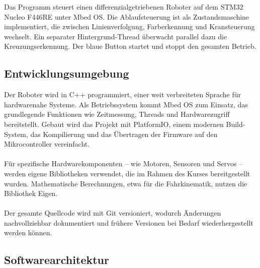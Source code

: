 \documentclass[11pt,a4paper]{article}
\begin{document}
	Das Programm steuert einen differenzialgetriebenen Roboter auf dem STM32 Nucleo F446RE unter Mbed OS. Die Ablaufsteuerung ist als Zustandsmaschine implementiert, die zwischen              
	Linienverfolgung, Farberkennung und Kransteuerung wechselt. Ein separater Hintergrund-Thread überwacht parallel dazu die Kreuzungserkennung. Der blaue Button startet und stoppt den
	gesamten Betrieb.
	
	\subsection{Entwicklungsumgebung}
	Der Roboter wird in C++ programmiert, einer weit verbreiteten Sprache für hardwarenahe Systeme. Als Betriebssystem kommt Mbed OS zum Einsatz, das grundlegende Funktionen wie Zeitmessung,  
	Threads und Hardwarezugriff bereitstellt. Gebaut wird das Projekt mit PlatformIO, einem modernen Build-System, das Kompilierung und das Übertragen der Firmware auf den Mikrocontroller
	vereinfacht.\\ \\
	\noindent
	Für spezifische Hardwarekomponenten – wie Motoren, Sensoren und Servos – werden eigene Bibliotheken verwendet, die im Rahmen des Kurses bereitgestellt wurden. Mathematische Berechnungen,  
	etwa für die Fahrkinematik, nutzen die Bibliothek Eigen.\\ \\
	\noindent
	Der gesamte Quellcode wird mit Git versioniert, wodurch Änderungen nachvollziehbar dokumentiert und frühere Versionen bei Bedarf wiederhergestellt werden können.
	
	\subsection{Softwarearchitektur}
\end{document}
